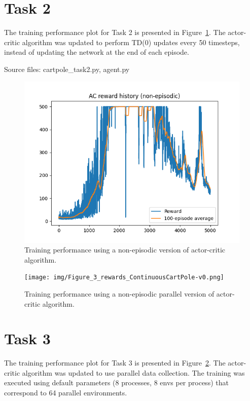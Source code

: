 \documentclass[12pt]{article}
\begin{document}
\section*{Task 2}

The training performance plot for Task 2 is presented in Figure~\ref*{fig:fig2}. 
The actor-critic algorithm was updated to perform TD(0) updates every 50 timesteps,
instead of updating the network at the end of each episode. 
\newline

\noindent
Source files: cartpole\_task2.py, agent.py

\begin{figure}[pht] 
	\centering  %
    \includegraphics[width=0.8\columnwidth]{img/Figure_2_task_2_cumulative_reward.png}
	\caption{Training performance using a non-episodic version of actor-critic algorithm.}
	\label{fig:fig2}
\end{figure}

\begin{figure}[phb] 
	\centering  %
    \texttt{[image: img/Figure\_3\_rewards\_ContinuousCartPole-v0.png]}
	\caption{Training performance using a non-episodic parallel version of actor-critic algorithm.}
	\label{fig:fig3}
\end{figure}


\section*{Task 3}

The training performance plot for Task 3 is presented in Figure~\ref*{fig:fig3}. The actor-critic algorithm was updated to use parallel data collection.
The training was executed using default parameters (8 processes, 8 envs per process) that correspond to 64 parallel environments. 
\newline
\end{document}
